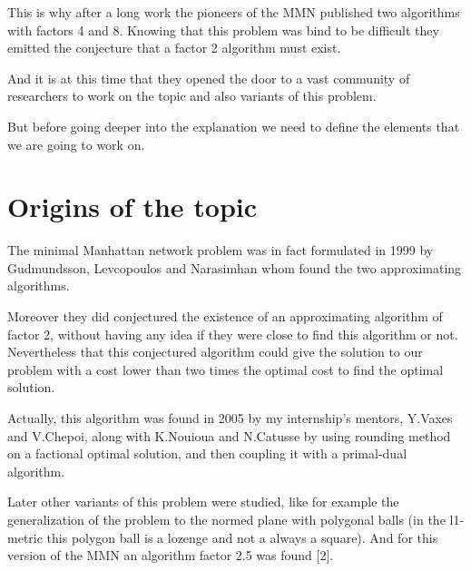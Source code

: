 This is why after a long work the pioneers of the MMN published two algorithms with factors 4 and 8. Knowing that this problem was bind to be difficult they emitted the conjecture that a factor 2 algorithm must exist.

And it is at this time that they opened the door to a vast community of researchers to work on the topic and also variants of this problem.

But before going deeper into the explanation we need to define the elements that we are going to work on. 

\section{Origins of the topic}%
The minimal Manhattan network problem was in fact formulated in 1999 by Gudmundsson, Levcopoulos and Narasimhan whom found the two approximating algorithms. 

Moreover they did conjectured the existence of an approximating algorithm of factor 2, without having any idea if they were close to find this algorithm or not. Nevertheless that this conjectured algorithm could give the solution to our problem with a cost lower than two times the optimal cost to find the optimal solution.

Actually, this algorithm was found in 2005 by my internship's mentors, Y.Vaxes and V.Chepoi, along with K.Nouioua and N.Catusse by using rounding method on a factional optimal solution, and then coupling it with a primal-dual algorithm.

Later other variants of this problem were studied, like for example the generalization of the problem to the normed plane with polygonal balls (in the l1-metric this polygon ball is a lozenge and not a always a square). And for this version of the MMN an algorithm factor 2.5 was found [2].